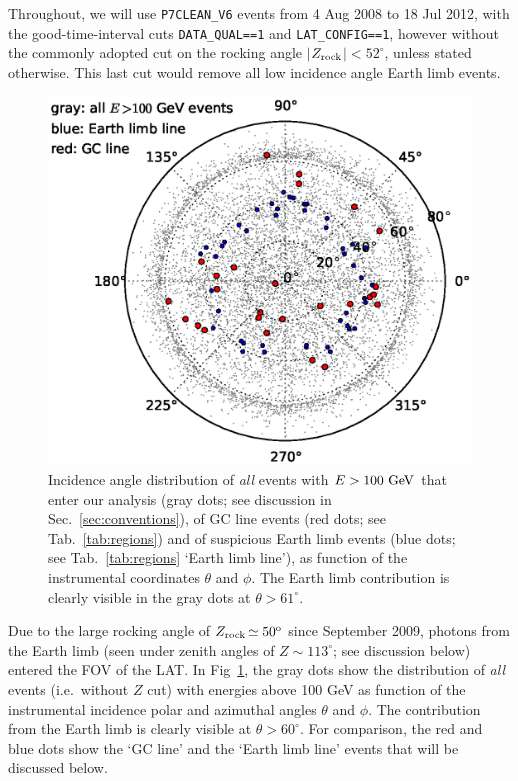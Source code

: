 \documentclass[aps,twocolumn,prd,superscriptaddress,showpacs,nofootinbib,fixfloat]{revtex4}
\newcommand{\GeV}{{\rm ~GeV}}
\newcommand{\degree}{^{\rm o}}
\newcommand{\zrock}{$Z_{\rm rock}$}
\begin{document}
Throughout, we will use \texttt{P7CLEAN\_V6} events from 4
Aug 2008 to 18 Jul 2012, with the good-time-interval cuts
\texttt{DATA\_QUAL==1} and \texttt{LAT\_CONFIG==1}, however
without the commonly adopted cut on the rocking angle
$|$\zrock$|<52^\circ$, unless stated otherwise. This last cut would remove
all low incidence angle Earth limb events.
\medskip


\medskip

\begin{figure}[h]
  \begin{center}
    \includegraphics[width=0.9\linewidth]{plots/polarCounts.eps}
    \vspace{-0.5cm}
  \end{center}
  \caption{Incidence angle distribution of \emph{all} events
  with $E>100\GeV$ that enter our analysis (gray dots; see
  discussion in Sec.~\ref{sec:conventions}), of GC line
  events (red dots; see Tab.~\ref{tab:regions}) and of
  suspicious Earth limb events (blue dots; see
  Tab.~\ref{tab:regions} `Earth limb line'), as function of
  the instrumental coordinates $\theta$ and $\phi$. The
  Earth limb contribution is clearly visible in the gray
  dots at $\theta > 61^\circ$.}
  \label{fig:phiThetaDist}
\end{figure}

Due to the large rocking angle of \zrock$\simeq50\degree$
since September 2009, photons from the Earth limb (seen
under zenith angles of $Z\sim113^\circ$; see discussion
below) entered the FOV of the LAT. In
Fig~\ref{fig:phiThetaDist}, the gray dots show the
distribution of \emph{all} events (i.e.~without $Z$ cut)
with energies above 100 GeV as function of the instrumental
incidence polar and azimuthal angles $\theta$ and $\phi$.
The contribution from the Earth limb is clearly visible at
$\theta>60^\circ$. For comparison, the red and blue dots
show the `GC line' and the `Earth limb line' events that
will be discussed below.
\end{document}

